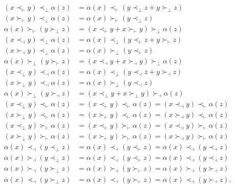 \documentclass[10pt,a4paper]{amsart}
\begin{document}
\begin{align}
(x \prec_\vdash y) \prec_\perp \alpha(z) &= \alpha(x) \prec_\vdash (y \prec_\perp z + y \succ_\perp z) \label{sq1}  \\
(x \succ_\vdash y) \prec_\perp \alpha(z) &= \alpha(x) \succ_\vdash (y \prec_\perp z) \label{sq2}\\
\alpha(x) \succ_\vdash (y \succ_\perp z) &= (x \prec_\vdash y + x \succ_\vdash y) \succ_\perp\alpha(z) \label{sq3}\\
(x \prec_\dashv y) \prec_\perp \alpha( z) &= \alpha(x) \prec_\perp (y \prec_\vdash z + y \succ_\vdash z) \label{sq4}\\
(x \succ_\dashv y) \prec_\perp \alpha(z) &= \alpha(x)\succ_\perp (y \prec_\vdash z) \label{sq5}\\
\alpha(x)\succ_\perp (y \succ_\vdash z) &= (x \prec_\dashv y + x \succ_\dashv y) \succ_\perp \alpha(z) \label{sq6}\\
(x \prec_\perp y) \prec_\dashv \alpha(z) &= \alpha(x) \prec_\perp (y \prec_\dashv z + y \succ_\dashv z) \label{sq7} \\
(x \succ_\perp y) \prec_\dashv \alpha(z) &= \alpha(x) \succ_\perp (y \prec_\dashv z) \label{sq8}\\
\alpha(x)\succ_\perp (y \succ_\dashv z) &= (x \prec_\perp y + x \succ_\perp y) \succ_\dashv \alpha(z) \label{sq9}\\
(x \prec_\perp y) \prec_\vdash \alpha(z) &= (x \prec_\vdash y) \prec_\vdash \alpha(z) = (x \prec_\dashv y) \prec_\vdash \alpha(z) \label{sq10}\\
(x \succ_\perp y) \prec_\vdash\alpha(z) &= (x \succ_\vdash y) \prec_\vdash \alpha(z) = (x \succ_\dashv y) \prec_\vdash \alpha(z) \label{sq11}\\
(x \prec_\perp y) \succ_\vdash\alpha(z) &= (x \prec_\vdash y) \succ_\vdash \alpha( z) = (x \prec_\dashv y) \succ_\vdash\alpha(z) \label{sq12}\\
(x \succ_\perp y) \succ_\vdash \alpha(z) &= (x \succ_\vdash y) \succ_\vdash\alpha(z) = (x \succ_\dashv y) \succ_\vdash\alpha(z) \label{sq13}\\
\alpha(x) \prec_\dashv (y \prec_\perp z) &=\alpha(x) \prec_\dashv (y \prec_\vdash z) = \alpha(x) \prec_\dashv (y \prec_\dashv z) \label{sq14}\\
\alpha(x) \succ_\dashv (y \prec_\perp z) &=\alpha(x) \prec_\dashv (y \prec_\vdash z) = \alpha(x) \prec_\dashv (y \prec_\dashv z) \label{sq15}\\
\alpha(x) \succ_\dashv (y \succ_\perp z) &= \alpha(x) \succ_\dashv (y \succ_\vdash z) = \alpha(x) \succ_\dashv (y \succ_\dashv z) \label{sq16}\\
\alpha(x) \prec_\dashv (y \succ_\perp z) &= \alpha(x) \prec_\dashv (y \succ_\vdash z) = \alpha(x) \prec_\dashv (y \succ_\dashv z).\label{sq17}
\end{align}
\end{document}
